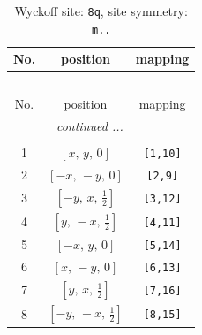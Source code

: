 \documentclass[fleqn,8pt]{jsarticle}
\begin{document}
\begin{longtable}{ccc}
\caption{Wyckoff site: {\tt 8q}, site symmetry: {\tt m..}}
 \\
 \hline \hline
No. & position & mapping \\ \hline \endfirsthead

\multicolumn{2}{l}{\tablename\ \thetable{}} \\
 \hline \hline
No. & position & mapping \\ \hline \endhead

 \hline \hline
\multicolumn{2}{r}{\footnotesize\it continued ...} \\ \endfoot

 \hline \hline
\multicolumn{2}{r}{} \\ \endlastfoot

1 & $\left[ x,\, y,\, 0 \right]$ & {\tt [1,10]} \\ \hline
2 & $\left[ - x,\, - y,\, 0 \right]$ & {\tt [2,9]} \\ \hline
3 & $\left[ - y,\, x,\, \frac{1}{2} \right]$ & {\tt [3,12]} \\ \hline
4 & $\left[ y,\, - x,\, \frac{1}{2} \right]$ & {\tt [4,11]} \\ \hline
5 & $\left[ - x,\, y,\, 0 \right]$ & {\tt [5,14]} \\ \hline
6 & $\left[ x,\, - y,\, 0 \right]$ & {\tt [6,13]} \\ \hline
7 & $\left[ y,\, x,\, \frac{1}{2} \right]$ & {\tt [7,16]} \\ \hline
8 & $\left[ - y,\, - x,\, \frac{1}{2} \right]$ & {\tt [8,15]} \\
\end{longtable}
\renewcommand{\arraystretch}{1.2}
\end{document}
